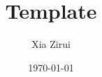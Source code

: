 \documentclass[12pt, a4paper, twoside]{book}
\title{\textbf{Template}}
\author{Xia Zirui}
\date{\today}
\begin{document}
	\renewcommand{\thepage}{\roman{page}}
	\maketitle
	\tableofcontents
	\ifodd\value{page}\newpage\null\fi
	\newpage
	\setcounter{page}{1}
	\renewcommand{\thepage}{\arabic{page}}

	
	

	
	
\end{document}
